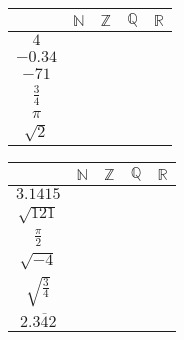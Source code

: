 
	\question

	
	\begin{minipage}{\linewidth}
	\begin{multicols}{2}
		\begin{tabular}{|c|c|c|c|c|}
			\hline
			                & $ \mathbb{N}$ & $ \mathbb{Z}  $ & $ \mathbb{Q}$ & $ \mathbb{R} $ \\
			\hline
			     $ 4 $      &      \solonly{\checkmark }         &  \solonly{\checkmark }                &    \solonly{\checkmark }            &    \solonly{\checkmark }             \\
			\hline
			   $ -0.34 $    &               &                 &    \solonly{\checkmark }            &      \solonly{\checkmark }           \\
			\hline
			    $ -71 $     &               &      \solonly{\checkmark }            &    \solonly{\checkmark }            &   \solonly{\checkmark }              \\
			\hline
			$ \frac{3}{4} $ &               &                 &     \solonly{\checkmark }           &        \solonly{\checkmark }         \\
			\hline
			    $ \pi $     &               &                 &               &    \solonly{\checkmark }             \\
			\hline
			 $ \sqrt{2} $   &               &                 &               &    \solonly{\checkmark }             \\
			\hline
		\end{tabular}
		
		\begin{tabular}{|c|c|c|c|c|}
			\hline
			                       & $ \mathbb{N}$ & $ \mathbb{Z}  $ & $ \mathbb{Q}$ & $ \mathbb{R} $ \\
			\hline
			      $ 3.1415 $       &               &                 &    \solonly{\checkmark }            &      \solonly{\checkmark }           \\
			\hline
			    $ \sqrt{121} $     &  \solonly{\checkmark }              &    \solonly{\checkmark }              &   \solonly{\checkmark }             &   \solonly{\checkmark }              \\
			\hline
			  $ \frac{\pi}{2} $    &               &                 &               &   \solonly{\checkmark }              \\
			\hline
			    $ \sqrt{-4} $      &               &                 &               &                \\
			\hline
			$ \sqrt{\frac{3}{4}} $ &               &                 &               &    \solonly{\checkmark }             \\
			\hline
			 $ 2.\overline{342} $  &               &                 &    \solonly{\checkmark }            &    \solonly{\checkmark }             \\
			\hline
		\end{tabular}
		
\end{multicols}
\end{minipage}


